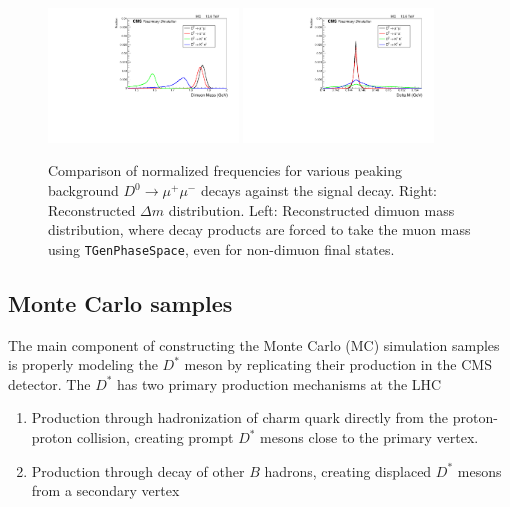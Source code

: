 \begin{figure}[htp]
    \begin{center}
      \includegraphics[width=0.45\textwidth]{figures/chapter4/reconstructed_D0_mass.pdf}
      \includegraphics[width=0.45\textwidth]{figures/chapter4/reconstructed_delta_m.pdf}\\
    \end{center}
    \caption{
      Comparison of normalized frequencies for various peaking background $D^0 \to \mu^+ \mu^-$ decays against the signal decay.
      Right: Reconstructed $\Delta m$ distribution.
      Left: Reconstructed dimuon mass distribution, where decay products are forced to take the muon mass using \texttt{TGenPhaseSpace}, even for non-dimuon final states.
    }
    \label{fig:reconstructed_D0_comparison}
  \end{figure}
  
  


\subsection{Monte Carlo samples}

The main component of constructing the Monte Carlo (MC) simulation samples is properly modeling the $D^*$ meson by replicating their production in the CMS detector. The $D^*$ has two primary production mechanisms at the LHC
\begin{enumerate}
    \item Production through hadronization of charm quark directly from the proton-proton collision, creating prompt $D^*$ mesons close to the primary vertex. 
    \item Production through decay of other $B$ hadrons, creating displaced $D^*$ mesons from a secondary vertex
\end{enumerate}

